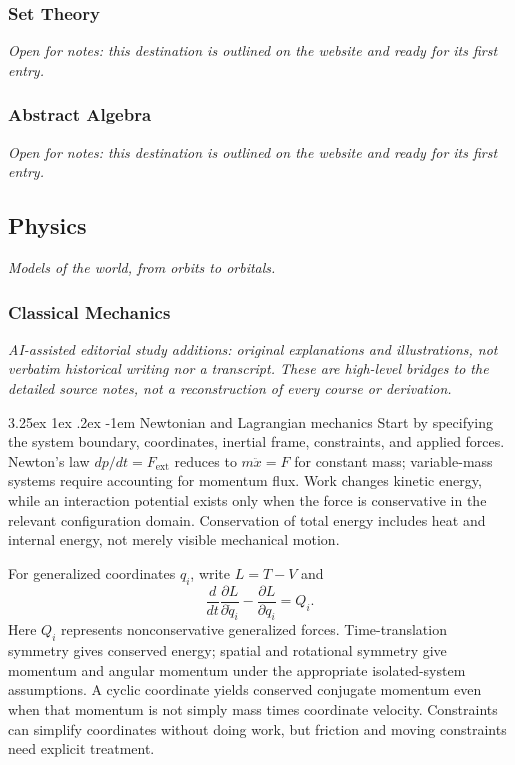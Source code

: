 \documentclass{article}
\makeatletter
\newcounter{subsubsubsection}[subsubsection]
\renewcommand\subparagraph{\@startsection{subparagraph}{6}{\parindent}%
  {3.25ex \@plus1ex \@minus .2ex}%
  {-1em}%
  {\normalfont\normalsize\bfseries}}
\makeatother
\begin{document}
\subsubsection{Set Theory}\label{sec:set-theory}
\textit{Open for notes: this destination is outlined on the website and ready for its first entry.}

\subsubsection{Abstract Algebra}\label{sec:abstract-algebra}
\textit{Open for notes: this destination is outlined on the website and ready for its first entry.}

\subsection{Physics}\label{sec:physics}
\textit{Models of the world, from orbits to orbitals.}

\subsubsection{Classical Mechanics}\label{sec:classical-mechanics}

\label{study-physics}
\textit{AI-assisted editorial study additions: original explanations and illustrations, not verbatim historical writing nor a transcript. These are high-level bridges to the detailed source notes, not a reconstruction of every course or derivation.}

\subparagraph{Newtonian and Lagrangian mechanics}
Start by specifying the system boundary, coordinates, inertial frame, constraints, and applied forces. Newton's law $d p/dt=F_{\mathrm{ext}}$ reduces to $m\ddot x=F$ for constant mass; variable-mass systems require accounting for momentum flux. Work changes kinetic energy, while an interaction potential exists only when the force is conservative in the relevant configuration domain. Conservation of total energy includes heat and internal energy, not merely visible mechanical motion.

For generalized coordinates $q_i$, write $L=T-V$ and
\begin{equation}
\frac{d}{dt}\frac{\partial L}{\partial\dot q_i}-\frac{\partial L}{\partial q_i}=Q_i.
\label{study-physics-lagrange}
\end{equation}
Here $Q_i$ represents nonconservative generalized forces. Time-translation symmetry gives conserved energy; spatial and rotational symmetry give momentum and angular momentum under the appropriate isolated-system assumptions. A cyclic coordinate yields conserved conjugate momentum even when that momentum is not simply mass times coordinate velocity. Constraints can simplify coordinates without doing work, but friction and moving constraints need explicit treatment.
\end{document}
